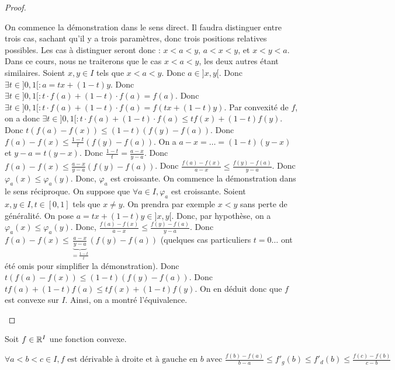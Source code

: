 \documentclass[12pt, a4paper]{report}
\begin{document}
\begin{proof}
  \begin{outline}
    \1[$\rightarrow$] On commence la démonstration dans le sens direct.
    \1 Il faudra distinguer entre trois cas, sachant qu'il y a trois paramètres, donc trois positions relatives possibles.
    \1 Les cas à distinguer seront donc : $x<a<y$, $a<x<y$, et $x<y<a$.
    \1 Dans ce cours, nous ne traiterons que le cas $x<a<y$, les deux autres étant similaires.
    \2 Soient $x,y \in I$ tels que $x<a<y$.
    \2 Donc $a \in ]x,y[$.
    \2 Donc $\exists t \in ]0,1[ : a = tx + (1-t)y$.
    \2 Donc $\exists t \in ]0,1[ : t\cdot f(a)+(1-t)\cdot f(a)=f(a)$.
    \2 Donc $\exists t \in ]0,1[ : t\cdot f(a)+(1-t)\cdot f(a)=f(tx+(1-t)y)$.
    \2 Par convexité de $f$, on a donc $\exists t \in ]0,1[ : t\cdot f(a)+(1-t)\cdot f(a)\le tf(x)+(1-t)f(y)$.
    \2 Donc $t(f(a)-f(x))\le (1-t)(f(y)-f(a))$.
    \2 Donc $f(a)-f(x)\le \frac{1-t}{t}(f(y)-f(a))$.
    \2 On a $a-x=\dots=(1-t)(y-x)$ et $y-a=t(y-x)$.
    \2 Donc $\frac{1-t}{t}=\frac{a-x}{y-a}$.
    \2 Donc $f(a)-f(x)\le \frac{a-x}{y-a}(f(y)-f(a))$.
    \2 Donc $\frac{f(a)-f(x)}{a-x}\le \frac{f(y)-f(a)}{y-a}$.
    \2 Donc $\varphi_a(x)\le \varphi_a(y)$.
    \2 Donc, $\varphi_a$ est croissante.
    \1[$\leftarrow$] On commence la démonstration dans le sens réciproque.
    \1 On suppose que $\forall a \in I, \varphi_a$ est croissante.
    \2 Soient $x,y \in I, t \in [0,1]$ tels que $x\not=y$.
    \2 On prendra par exemple $x<y$ sans perte de généralité.
    \2 On pose $a = tx + (1-t)y \in ]x,y[$.
    \2 Donc, par hypothèse, on a $\varphi_a(x) \le \varphi_a(y)$.
    \2 Donc, $\frac{f(a)-f(x)}{a-x} \le \frac{f(y)-f(a)}{y-a}$.
    \2 Donc $f(a)-f(x) \le \underbrace{\frac{a-x}{y-a}}_{=\frac{1-t}{t}}(f(y)-f(a))$ (quelques cas particuliers $t=0\dots$ ont été omis pour simplifier la démonstration).
    \2 Donc $t(f(a)-f(x)) \le (1-t)(f(y)-f(a))$.
    \2 Donc $tf(a)+(1-t)f(a) \le tf(x)+(1-t)f(y)$.
    \2 On en déduit donc que $f$ est convexe sur $I$.
    \1 Ainsi, on a montré l'équivalence.
  \end{outline}
\end{proof}

\begin{property}
  Soit $f \in \mathbb{R}^I$ une fonction convexe.

  $\forall a<b<c \in I, f \text{ est dérivable à droite et à gauche en } b \text{ avec } \frac{f(b)-f(a)}{b-a} \le f'_g(b) \le f'_d(b) \le \frac{f(c)-f(b)}{c-b}$
\end{property}
\end{document}
